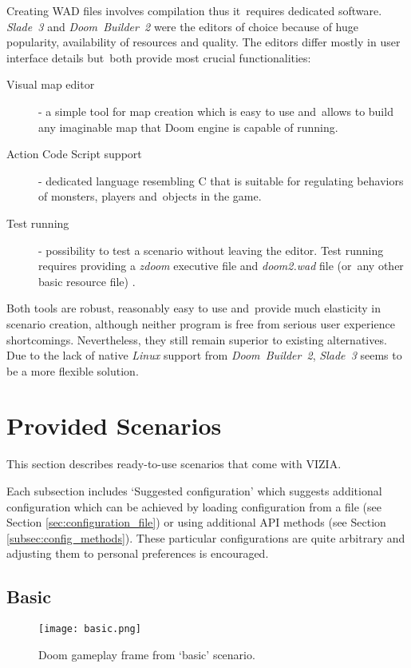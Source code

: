 	Creating WAD files involves compilation thus it~requires dedicated software. \emph{Slade~3} and \emph{Doom~Builder~2} were the editors of choice because of huge popularity, availability of resources and quality. The editors differ mostly in user interface details but~both provide most crucial functionalities:

	\begin{description}
		\item [Visual map editor] - a simple tool for map creation which is easy to use and~allows to build any imaginable map that Doom engine is capable of running.
		\item [Action Code Script support] - dedicated language resembling C that is suitable for regulating behaviors of monsters, players and~objects in the game.
		\item [Test running] - possibility to test a scenario without leaving the editor. Test running requires providing a \emph{zdoom} executive file and \emph{doom2.wad} file (or~any other basic resource file) . 
	\end{description}

	Both tools are robust, reasonably easy to use and~provide much elasticity in scenario creation, although neither program is free from serious user experience shortcomings. Nevertheless, they still remain superior to existing alternatives. Due to the lack of native \emph{Linux} support from \emph{Doom~Builder~2}, \emph{Slade~3} seems to be a more flexible solution. 

	\newpage
\section{Provided Scenarios}\label{sec:scenarios}
	This section describes ready-to-use scenarios that come with VIZIA.

	Each subsection includes `Suggested configuration' which suggests additional configuration which can be achieved by loading	configuration from a file (see Section \ref{sec:configuration_file}) or using additional API methods (see Section \ref{subsec:config_methods}). These particular configurations are quite arbitrary and adjusting them to personal preferences is encouraged.

	\subsection{Basic}\label{subsec:basic}
		
		\begin{figure}
			\centering
			\texttt{[image: basic.png]}
			\caption{Doom gameplay frame from `basic' scenario.}\label{fig:basic}
		\end{figure}

